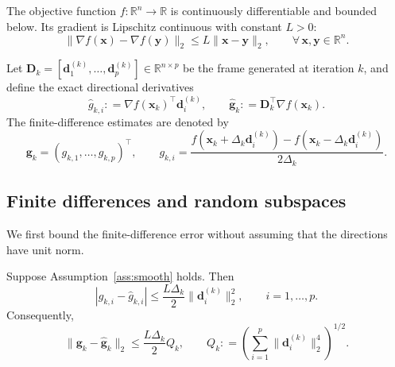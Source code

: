 \documentclass[smallextended]{svjour3}
\newcommand{\bx}{\bm{x}}
\newcommand{\bd}{\bm{d}}
\newcommand{\bg}{\bm{g}}
\providecommand{\coloneqq}{\mathrel{\mathop:}=}
\begin{document}
\begin{assumption}
\label{ass:smooth}
The objective function $f:\mathbb R^n\to\mathbb R$ is continuously differentiable and bounded below. Its gradient is Lipschitz continuous with constant $L>0$:
\begin{equation}
\label{eq:lipschitz_grad}
\|\nabla f(\bx)-\nabla f(\bm y)\|_2 \le L\|\bx-\bm y\|_2, \qquad \forall\, \bx,\bm y\in\mathbb R^n.
\end{equation}
\end{assumption}

Let $\bm D_k = [\bd_1^{(k)},\ldots,\bd_p^{(k)}] \in \mathbb{R}^{n \times p}$ be the frame generated at iteration $k$, and define the exact directional derivatives
\[
\hat g_{k,i} \coloneqq \nabla f(\bx_k)^\top\bd_i^{(k)}, \qquad \hat{\bg}_k \coloneqq \bm D_k^\top\nabla f(\bx_k).
\]
The finite-difference estimates are denoted by
\[
\bg_k = (g_{k,1},\ldots,g_{k,p})^\top, \qquad g_{k,i} = \frac{f(\bx_k+\Delta_k\bd_i^{(k)}) - f(\bx_k-\Delta_k\bd_i^{(k)})}{2\Delta_k}.
\]

\subsection{Finite differences and random subspaces}
\label{subsec:estimation}

We first bound the finite-difference error without assuming that the directions have unit norm.

\begin{lemma}
\label{lem:fd_general}
\label{lem:fd}
Suppose Assumption~\ref{ass:smooth} holds. Then
\begin{equation}
\label{eq:fd_general_component}
|g_{k,i}-\hat g_{k,i}| \le \frac{L\Delta_k}{2} \|\bd_i^{(k)}\|_2^2, \qquad i=1,\ldots,p.
\end{equation}
Consequently,
\begin{equation}
\label{eq:fd_general_vector}
\|\bg_k-\hat{\bg}_k\|_2 \le \frac{L\Delta_k}{2} Q_k, \qquad Q_k \coloneqq \left( \sum_{i=1}^p \|\bd_i^{(k)}\|_2^4 \right)^{1/2}.
\end{equation}
\end{lemma}
\end{document}
